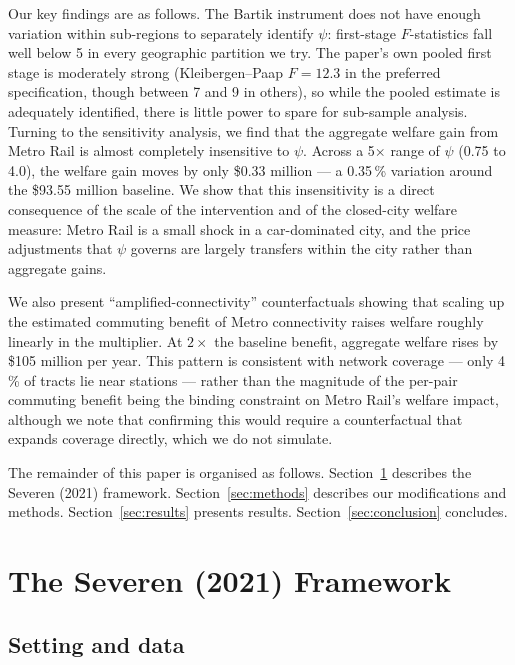\documentclass[12pt,a4paper]{article}
\begin{document}
Our key findings are as follows.  The Bartik instrument does not have enough
variation within sub-regions to separately identify $\psi$: first-stage
$F$-statistics fall well below 5 in every geographic partition we try.  The
paper's own pooled first stage is moderately strong (Kleibergen--Paap
$F = 12.3$ in the preferred specification, though between 7 and 9 in others),
so while the pooled estimate is adequately identified, there is little power to
spare for sub-sample analysis.  Turning to the sensitivity analysis, we find
that the aggregate welfare gain from Metro Rail is almost completely insensitive
to $\psi$.  Across a 5$\times$ range of $\psi$ (0.75 to 4.0), the welfare gain
moves by only \$0.33 million --- a 0.35\,\% variation around the \$93.55 million
baseline.  We show that this insensitivity is a direct consequence of the scale
of the intervention and of the closed-city welfare measure: Metro Rail is a
small shock in a car-dominated city, and the price adjustments that $\psi$
governs are largely transfers within the city rather than aggregate gains.

We also present ``amplified-connectivity'' counterfactuals showing that scaling
up the estimated commuting benefit of Metro connectivity raises welfare roughly
linearly in the multiplier.  At $2\times$ the baseline benefit, aggregate
welfare rises by \$105 million per year.  This pattern is consistent with
network coverage --- only 4\,\% of tracts lie near stations --- rather than the
magnitude of the per-pair commuting benefit being the binding constraint on
Metro Rail's welfare impact, although we note that confirming this would require
a counterfactual that expands coverage directly, which we do not simulate.

The remainder of this paper is organised as follows.  Section~\ref{sec:framework}
describes the Severen (2021) framework.  Section~\ref{sec:methods} describes our
modifications and methods.  Section~\ref{sec:results} presents results.
Section~\ref{sec:conclusion} concludes.

\section{The Severen (2021) Framework}
\label{sec:framework}

\subsection{Setting and data}
\end{document}
